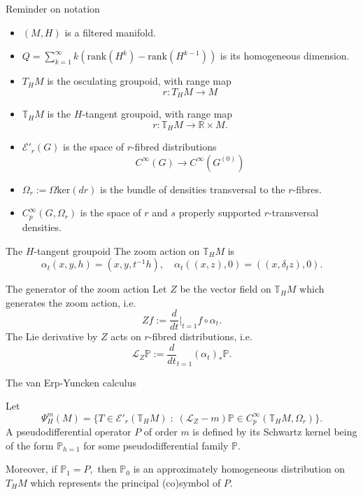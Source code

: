 \documentclass{beamer}
\numberwithin{equation}{section}
\theoremstyle{plain}
\theoremstyle{plain}
\theoremstyle{definition}
\theoremstyle{plain}
\theoremstyle{plain}
\theoremstyle{definition}
\newcommand{\Rl}{\mathbb{R}}
\newcommand{\Ec}{\mathcal{E}}
\newcommand{\Lc}{\mathcal{L}}
\newcommand{\Tb}{\mathbb{T}}
\newcommand{\Pb}{\mathbb{P}}
\newcommand{\Psib}{\mathbb{\Psi}}
\begin{document}
\begin{frame}{Reminder on notation}
    \begin{itemize}
        \item{} $(M,H)$ is a filtered manifold.
        \item{} $Q = \sum_{k=1}^{\infty} k(\mathrm{rank}(H^k)-\mathrm{rank}(H^{k-1}))$ is its homogeneous dimension.
        \item{} $T_HM$ is the osculating groupoid, with range map
        \[
            r:T_HM\to M
        \]
        \item{} $\Tb_HM$ is the $H$-tangent groupoid, with range map
        \[
            r:\Tb_HM\to \Rl\times M.
        \]
        \item{} $\Ec'_r(G)$ is the space of $r$-fibred distributions
        \[
            C^\infty(G)\to C^\infty(G^{(0)})
        \]
        \item{} $\Omega_r := \Omega \mathrm{ker}(dr)$ is the bundle of densities transversal to the $r$-fibres.
        \item{} $C^\infty_p(G,\Omega_r)$ is the space of $r$ and $s$ properly supported $r$-transversal densities.
    \end{itemize}
\end{frame}

\begin{frame}{The $H$-tangent groupoid}
    The zoom action on $\Tb_HM$ is
    \[
        \alpha_t(x,y,h) = (x,y,t^{-1}h),\quad \alpha_t((x,z),0) = ((x,\delta_t z),0).
    \]
\end{frame}

\begin{frame}{The generator of the zoom action}
    Let $Z$ be the vector field on $\Tb_HM$ which generates the zoom action, i.e.
    \[
        Zf := \frac{d}{dt}|_{t=1} f\circ\alpha_t.
    \]
    The Lie derivative by $Z$ acts on $r$-fibred distributions, i.e.
    \[
        \Lc_Z\Pb := \frac{d}{dt}_{t=1}(\alpha_t)_*\Pb.
    \]
\end{frame}

\begin{frame}{The van Erp-Yuncken calculus}
    \begin{definition}
        Let
        \[
            \Psib^{m}_H(M) = \{T\in \Ec'_r(\Tb_HM)\;:\;(\Lc_Z-m)\Pb \in C^{\infty}_p(\Tb_HM,\Omega_r)\}.
        \]
        A pseudodifferential operator $P$ of order $m$ is defined by its Schwartz kernel being of the form $\Pb_{h=1}$ for some pseudodifferential family $\Pb.$
    \end{definition}
    Moreover, if $\Pb_1=P,$ then $\Pb_0$ is an approximately homogeneous distribution on $T_HM$ which represents the principal (co)symbol of $P.$
\end{frame}
\end{document}
